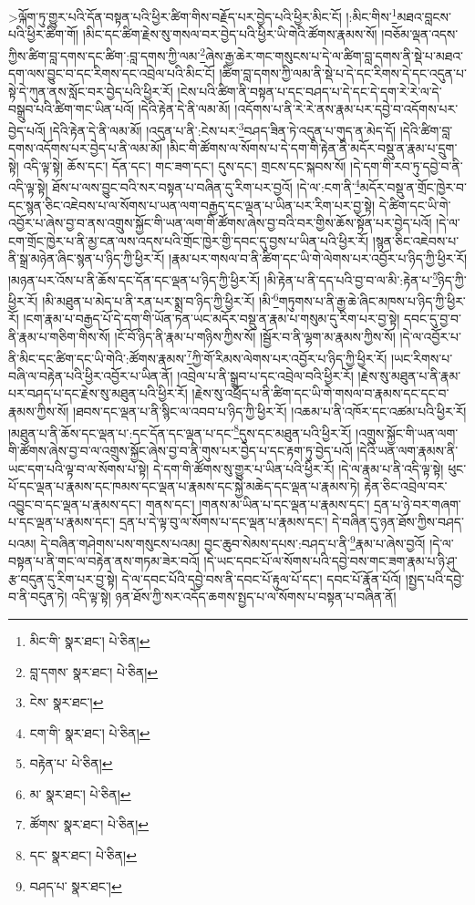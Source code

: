 >ལྐོག་ཏུ་གྱུར་པའི་དོན་བསྟན་པའི་ཕྱིར་ཚིག་གིས་བརྗོད་པར་བྱེད་པའི་ཕྱིར་མིང་ངོ། །:མིང་གིས་\footnote{མིང་གི་  སྣར་ཐང་།  པེ་ཅིན། }མཐའ་བླངས་པའི་ཕྱིར་ཚིག་གོ། །མིང་དང་ཚིག་རྗེས་སུ་གསལ་བར་བྱེད་པའི་ཕྱིར་ཡི་གེའི་ཚོགས་རྣམས་སོ། །བཅོམ་ལྡན་འདས་ཀྱིས་ཚིག་བླ་དགས་དང་ཚིག་:བླ་དགས་ཀྱི་ལམ་\footnote{བླ་དགས་  སྣར་ཐང་།  པེ་ཅིན། }ཞེས་རྒྱ་ཆེར་གང་གསུངས་པ་དེ་ལ་ཚིག་བླ་དགས་ནི་སྡེ་པ་མཐའ་དག་ལས་བྱུང་བ་དང་རིགས་དང་འབྲེལ་པའི་མིང་ངོ། །ཚིག་བླ་དགས་ཀྱི་ལམ་ནི་སྡེ་པ་དེ་དང་རིགས་དེ་དང་འདུན་པ་སྟེ་དེ་ཀུན་ནས་སློང་བར་བྱེད་པའི་ཕྱིར་རོ། །ངེས་པའི་ཚིག་ནི་བསྟན་པ་དང་བཤད་པ་དེ་དང་དེ་དག་རེ་རེ་ལ་དེ་བསྒྲུབ་པའི་ཚིག་གང་ཡིན་པའོ། །དེའི་རྟེན་དེ་ནི་ལམ་མོ། །འདོགས་པ་ནི་རེ་རེ་ནས་རྣམ་པར་དབྱེ་བ་འདོགས་པར་བྱེད་པའོ། །དེའི་རྟེན་དེ་ནི་ལམ་མོ། །འདུན་པ་ནི་:ངེས་པར་\footnote{ངེས་  སྣར་ཐང་། }བཤད་ཟིན་ཏེ་འདུན་པ་གུད་ན་མེད་དོ། །དེའི་ཚིག་བླ་དགས་འདོགས་པར་བྱེད་པ་ནི་ལམ་མོ། །མིང་གི་ཚོགས་ལ་སོགས་པ་དེ་དག་གི་རྟེན་ནི་མདོར་བསྡུ་ན་རྣམ་པ་དྲུག་སྟེ། འདི་ལྟ་སྟེ། ཆོས་དང་། དོན་དང་། གང་ཟག་དང་། དུས་དང་། གྲངས་དང་སྐབས་སོ། །དེ་དག་གི་རབ་ཏུ་དབྱེ་བ་ནི་འདི་ལྟ་སྟེ། ཐོས་པ་ལས་བྱུང་བའི་སར་བསྟན་པ་བཞིན་དུ་རིག་པར་བྱའོ། །དེ་ལ་:ངག་ནི་\footnote{ངག་གི་  སྣར་ཐང་།  པེ་ཅིན། }མདོར་བསྡུ་ན་གྲོང་ཁྱེར་བ་དང་སྙན་ཅིང་འཇེབས་པ་ལ་སོགས་པ་ཡན་ལག་བརྒྱད་དང་ལྡན་པ་ཡིན་པར་རིག་པར་བྱ་སྟེ། དེ་ཚིག་དང་ཡི་གེ་འབྱོར་པ་ཞེས་བྱ་བ་ནས་འགྲུས་སྐྱོང་གི་ཡན་ལག་གི་ཚོགས་ཞེས་བྱ་བའི་བར་གྱིས་ཆོས་སྟོན་པར་བྱེད་པའོ། །དེ་ལ་ངག་གྲོང་ཁྱེར་པ་ནི་མྱ་ངན་ལས་འདས་པའི་གྲོང་ཁྱེར་གྱི་དབང་དུ་བྱས་པ་ཡིན་པའི་ཕྱིར་རོ། །སྙན་ཅིང་འཇེབས་པ་ནི་སྒྲ་མཉེན་ཞིང་སྙན་པ་ཉིད་ཀྱི་ཕྱིར་རོ། །རྣམ་པར་གསལ་བ་ནི་ཚིག་དང་ཡི་གེ་ལེགས་པར་འབྱོར་པ་ཉིད་ཀྱི་ཕྱིར་རོ། །མཉན་པར་འོས་པ་ནི་ཆོས་དང་དོན་དང་ལྡན་པ་ཉིད་ཀྱི་ཕྱིར་རོ། །མི་རྟེན་པ་ནི་དད་པའི་བྱ་བ་ལ་མི་:རྟེན་པ་\footnote{བརྟེན་པ་  པེ་ཅིན། }ཉིད་ཀྱི་ཕྱིར་རོ། །མི་མཐུན་པ་མེད་པ་ནི་རན་པར་སྨྲ་བ་ཉིད་ཀྱི་ཕྱིར་རོ། །མི་\footnote{མ་  སྣར་ཐང་།  པེ་ཅིན། }གཏུགས་པ་ནི་རྒྱ་ཆེ་ཞིང་མཁས་པ་ཉིད་ཀྱི་ཕྱིར་རོ། །ངག་རྣམ་པ་བརྒྱད་པོ་དེ་དག་གི་ཡོན་ཏན་ཡང་མདོར་བསྡུ་ན་རྣམ་པ་གསུམ་དུ་རིག་པར་བྱ་སྟེ། དབང་དུ་བྱ་བ་ནི་རྣམ་པ་གཅིག་གིས་སོ། །ངོ་བོ་ཉིད་ནི་རྣམ་པ་གཉིས་ཀྱིས་སོ། །སྦྱོར་བ་ནི་ལྷག་མ་རྣམས་ཀྱིས་སོ། །དེ་ལ་འབྱོར་པ་ནི་མིང་དང་ཚིག་དང་ཡི་གེའི་:ཚོགས་རྣམས་\footnote{ཚོགས་  སྣར་ཐང་།  པེ་ཅིན། }ཀྱི་གོ་རིམས་ལེགས་པར་འབྱོར་པ་ཉིད་ཀྱི་ཕྱིར་རོ། །ཡང་རིགས་པ་བཞི་ལ་བརྟེན་པའི་ཕྱིར་འབྱོར་པ་ཡིན་ནོ། །འབྲེལ་པ་ནི་སྒྲུབ་པ་དང་འབྲེལ་བའི་ཕྱིར་རོ། །རྗེས་སུ་མཐུན་པ་ནི་རྣམ་པར་བཤད་པ་དང་རྗེས་སུ་མཐུན་པའི་ཕྱིར་རོ། །རྗེས་སུ་འཕྲོད་པ་ནི་ཚིག་དང་ཡི་གེ་གསལ་བ་རྣམས་དང་དང་བ་རྣམས་ཀྱིས་སོ། །ཐབས་དང་ལྡན་པ་ནི་སྙིང་ལ་འབབ་པ་ཉིད་ཀྱི་ཕྱིར་རོ། །འཆམ་པ་ནི་འཁོར་དང་འཚམ་པའི་ཕྱིར་རོ། །མཐུན་པ་ནི་ཆོས་དང་ལྡན་པ་:དང་དོན་དང་ལྡན་པ་དང་\footnote{དང་  སྣར་ཐང་།  པེ་ཅིན། }དུས་དང་མཐུན་པའི་ཕྱིར་རོ། །འགྲུས་སྐྱོང་གི་ཡན་ལག་གི་ཚོགས་ཞེས་བྱ་བ་ལ་འགྲུས་སྐྱོང་ཞེས་བྱ་བ་ནི་གུས་པར་བྱེད་པ་དང་རྟག་ཏུ་བྱེད་པའོ། །དེའི་ཡན་ལག་རྣམས་ནི་ཡང་དག་པའི་ལྟ་བ་ལ་སོགས་པ་སྟེ། དེ་དག་གི་ཚོགས་སུ་གྱུར་པ་ཡིན་པའི་ཕྱིར་རོ། །དེ་ལ་རྣམ་པ་ནི་འདི་ལྟ་སྟེ། ཕུང་པོ་དང་ལྡན་པ་རྣམས་དང་ཁམས་དང་ལྡན་པ་རྣམས་དང་སྐྱེ་མཆེད་དང་ལྡན་པ་རྣམས་ཏེ། རྟེན་ཅིང་འབྲེལ་བར་འབྱུང་བ་དང་ལྡན་པ་རྣམས་དང་། གནས་དང་། །གནས་མ་ཡིན་པ་དང་ལྡན་པ་རྣམས་དང་། དྲན་པ་ཉེ་བར་གཞག་པ་དང་ལྡན་པ་རྣམས་དང་། དྲན་པ་དེ་ལྟ་བུ་ལ་སོགས་པ་དང་ལྡན་པ་རྣམས་དང་། དེ་བཞིན་དུ་ཉན་ཐོས་ཀྱིས་བཤད་པའམ། དེ་བཞིན་གཤེགས་པས་གསུངས་པའམ། བྱང་ཆུབ་སེམས་དཔས་:བཤད་པ་ནི་\footnote{བཤད་པ་  སྣར་ཐང་། }རྣམ་པ་ཞེས་བྱའོ། །དེ་ལ་བསྟན་པ་ནི་གང་ལ་བརྟེན་ནས་གཏམ་ཟེར་བའོ། །དེ་ཡང་དབང་པོ་ལ་སོགས་པའི་དབྱེ་བས་གང་ཟག་རྣམ་པ་ཉི་ཤུ་རྩ་བདུན་དུ་རིག་པར་བྱ་སྟེ། དེ་ལ་དབང་པོའི་དབྱེ་བས་ནི་དབང་པོ་རྟུལ་པོ་དང་། དབང་པོ་རྣོན་པོའོ། །སྤྱད་པའི་དབྱེ་བ་ནི་བདུན་ཏེ། འདི་ལྟ་སྟེ། ཉན་ཐོས་ཀྱི་སར་འདོད་ཆགས་སྤྱད་པ་ལ་སོགས་པ་བསྟན་པ་བཞིན་ནོ། 
